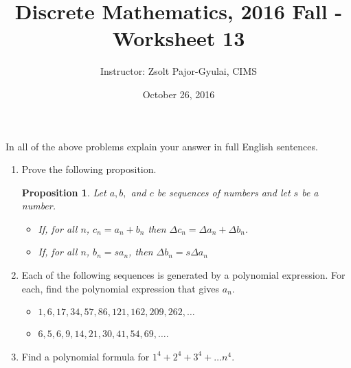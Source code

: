 \documentclass[11pt]{preprint}
\title{Discrete Mathematics, 2016 Fall - Worksheet 13}
\author{Instructor: Zsolt Pajor-Gyulai, CIMS}
\date{October 26, 2016}
\def\enumb{\begin{enumerate}}
\def\enume{\end{enumerate}}
\newtheorem{proposition}{Proposition}
\begin{document}
\maketitle

In all of the above problems explain your answer in full English sentences.
\enumb

\item Prove the following proposition.

\begin{proposition}
Let $a,b,$ and $c$ be sequences of numbers and let $s$ be a number.
\begin{itemize}
\item If, for all $n$, $c_n=a_n+b_n$ then $\Delta c_n=\Delta a_n+\Delta b_n$.
\item If, for all $n$, $b_n=sa_n$, then $\Delta b_n=s\Delta a_n$
\end{itemize}
\end{proposition}


\item Each of the following sequences is generated by a polynomial expression. For each, find the polynomial expression that gives $a_n$.
\begin{itemize}
\item $1,6,17,34,57,86,121,162,209,262,\dots$
\item $6,5,6,9,14,21,30,41,54,69,\dots$.
\end{itemize}

\item Find a polynomial formula for $1^4+2^4+3^4+\dots n^4$.
\enume
\end{document}
